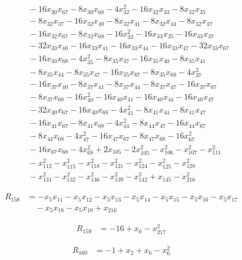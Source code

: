 \begin{align*}
&\quad -16 x_{30} x_{67} -8 x_{30} x_{68} -4 x_{32}^{2} -16 x_{32} x_{33} -8 x_{32} x_{35} \\
&\quad -8 x_{32} x_{37} -16 x_{32} x_{40} -8 x_{32} x_{41} -8 x_{32} x_{44} -8 x_{32} x_{47} \\
&\quad -16 x_{32} x_{67} -8 x_{32} x_{68} -16 x_{33}^{2} -16 x_{33} x_{35} -16 x_{33} x_{37} \\
&\quad -32 x_{33} x_{40} -16 x_{33} x_{41} -16 x_{33} x_{44} -16 x_{33} x_{47} -32 x_{33} x_{67} \\
&\quad -16 x_{33} x_{68} -4 x_{35}^{2} -8 x_{35} x_{37} -16 x_{35} x_{40} -8 x_{35} x_{41} \\
&\quad -8 x_{35} x_{44} -8 x_{35} x_{47} -16 x_{35} x_{67} -8 x_{35} x_{68} -4 x_{37}^{2} \\
&\quad -16 x_{37} x_{40} -8 x_{37} x_{41} -8 x_{37} x_{44} -8 x_{37} x_{47} -16 x_{37} x_{67} \\
&\quad -8 x_{37} x_{68} -16 x_{40}^{2} -16 x_{40} x_{41} -16 x_{40} x_{44} -16 x_{40} x_{47} \\
&\quad -32 x_{40} x_{67} -16 x_{40} x_{68} -4 x_{41}^{2} -8 x_{41} x_{44} -8 x_{41} x_{47} \\
&\quad -16 x_{41} x_{67} -8 x_{41} x_{68} -4 x_{44}^{2} -8 x_{44} x_{47} -16 x_{44} x_{67} \\
&\quad -8 x_{44} x_{68} -4 x_{47}^{2} -16 x_{47} x_{67} -8 x_{47} x_{68} -16 x_{67}^{2} \\
&\quad -16 x_{67} x_{68} -4 x_{68}^{2} +2 x_{105} -2 x_{105}^{2} -x_{106}^{2} -x_{107}^{2} -x_{111}^{2} \\
&\quad -x_{112}^{2} -x_{115}^{2} -x_{118}^{2} -x_{121}^{2} -x_{124}^{2} -x_{125}^{2} -x_{128}^{2} \\
&\quad -x_{131}^{2} -x_{132}^{2} -x_{136}^{2} -x_{139}^{2} -x_{142}^{2} +x_{145} -x_{216}^{2}
\end{align*}

\begin{align*}
R_{158} &= -x_{5} x_{11} -x_{5} x_{12} -x_{5} x_{13} -x_{5} x_{14} -x_{5} x_{15} -x_{5} x_{16} -x_{5} x_{17} \\
&\quad -x_{5} x_{18} -x_{5} x_{19} +x_{216}
\end{align*}

\begin{align*}
R_{159} &= -16 +x_{0} -x_{217}^{2}
\end{align*}

\begin{align*}
R_{160} &= -1 +x_{2} +x_{6} -x_{6}^{2}
\end{align*}

